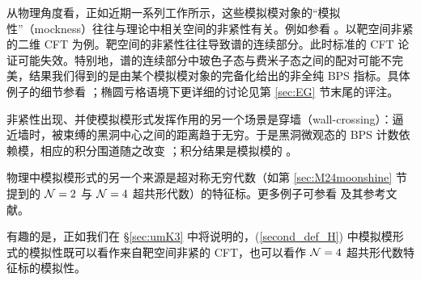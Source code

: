 \documentclass[11pt,a4paper,fontset=windows]{ctexart}
\numberwithin{equation}{section}
\begin{document}

从物理角度看，正如近期一系列工作所示，这些模拟模对象的“模拟性”（mockness）往往与理论中相关空间的非紧性有关。例如参看 \cite{VafaWitten1994,Troost:2010ud,Dabholkar:2012nd,Alexandrov:2012au,UMk3}。以靶空间非紧的二维 CFT 为例。靶空间的非紧性往往导致谱的连续部分。此时标准的 CFT 论证可能失效。特别地，谱的连续部分中玻色子态与费米子态之间的配对可能不完美，结果我们得到的是由某个模拟模对象的完备化给出的非全纯 BPS 指标。具体例子的细节参看 \cite{Troost:2010ud,Eguchi:2010cb,Eguchi:2004yi, Ashok:2013pya,Ashok:2011cy,Murthy:2013mya}；椭圆亏格语境下更详细的讨论见第 \ref{sec:EG} 节末尾的评注。


非紧性出现、并使模拟模形式发挥作用的另一个场景是穿墙（wall-crossing）：逼近墙时，被束缚的黑洞中心之间的距离趋于无穷。于是黑洞微观态的 BPS 计数依赖模，相应的积分围道随之改变 \cite{Cheng2007a}；积分结果是模拟模的 \cite{Dabholkar:2012nd}。


物理中模拟模形式的另一个来源是超对称无穷代数（如第 \ref{sec:M24moonshine} 节提到的 ${\cal N}=2$ 与 ${\cal N}=4$ 超共形代数）的特征标。更多例子可参看 \cite{Kac:2014rra} 及其参考文献。


有趣的是，正如我们在 \S\ref{sec:umK3} 中将说明的，(\ref{second_def_H}) 中模拟模形式的模拟性既可以看作来自靶空间非紧的 CFT，也可以看作 ${\cal N}=4$ 超共形代数特征标的模拟性。
\end{document}
